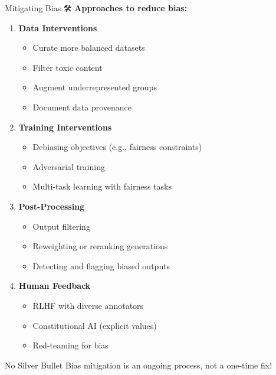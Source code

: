 \documentclass[aspectratio=169]{beamer}
\begin{document}
\begin{frame}[shrink=10]{Mitigating Bias 🛠️}
\textbf{Approaches to reduce bias:}

\vspace{0.5em}

\begin{enumerate}\setlength{\itemsep}{0pt}
    \item \textbf{Data Interventions}
    \begin{itemize}\setlength{\itemsep}{0pt}
        \item Curate more balanced datasets
        \item Filter toxic content
        \item Augment underrepresented groups
        \item Document data provenance
    \end{itemize}

    \item \textbf{Training Interventions}
    \begin{itemize}\setlength{\itemsep}{0pt}
        \item Debiasing objectives (e.g., fairness constraints)
        \item Adversarial training
        \item Multi-task learning with fairness tasks
    \end{itemize}

    \item \textbf{Post-Processing}
    \begin{itemize}\setlength{\itemsep}{0pt}
        \item Output filtering
        \item Reweighting or reranking generations
        \item Detecting and flagging biased outputs
    \end{itemize}

    \item \textbf{Human Feedback}
    \begin{itemize}\setlength{\itemsep}{0pt}
        \item RLHF with diverse annotators
        \item Constitutional AI (explicit values)
        \item Red-teaming for bias
    \end{itemize}
\end{enumerate}

\vspace{0.3em}

\begin{alertblock}{No Silver Bullet}
Bias mitigation is an ongoing process, not a one-time fix!
\end{alertblock}
\end{frame}
\end{document}
